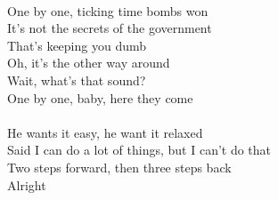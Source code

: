 \\
One by one, ticking time bombs won \\
It's not the secrets of the government \\
That's keeping you dumb \\
Oh, it's the other way around \\
Wait, what's that sound? \\
One by one, baby, here they come \\
\\
He wants it easy, he want it relaxed \\
Said I can do a lot of things, but I can't do that \\
Two steps forward, then three steps back \\
Alright \\
